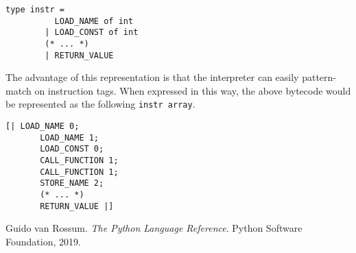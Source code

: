 \documentclass[11pt, twoside]{article}
\begin{document}
    \begin{lstlisting}[language=caml]
        type instr =
          LOAD_NAME of int
        | LOAD_CONST of int
        (* ... *)
        | RETURN_VALUE
    \end{lstlisting}
    The advantage of this representation is that the interpreter can easily pattern-match on instruction tags. When expressed in this way, the above bytecode would be represented as the following \texttt{instr array}.
    \begin{lstlisting}[language=caml]
    [| LOAD_NAME 0;
       LOAD_NAME 1;
       LOAD_CONST 0;
       CALL_FUNCTION 1;
       CALL_FUNCTION 1;
       STORE_NAME 2;
       (* ... *)
       RETURN_VALUE |]
    \end{lstlisting}


\begin{thebibliography}{1}
     Guido van Rossum. \textit{The Python Language Reference}. Python Software Foundation, 2019.
\end{thebibliography}
\end{document}
